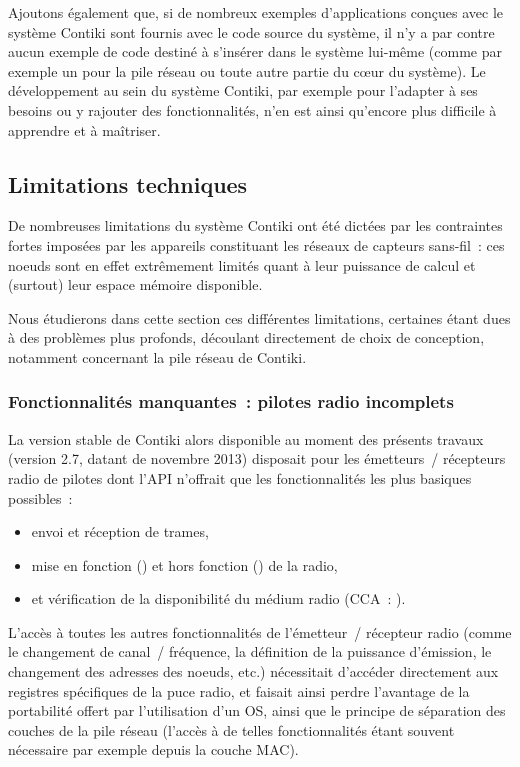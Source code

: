Ajoutons également que, si de nombreux exemples d'applications conçues
avec le système Contiki sont fournis avec le code source du système,
il n'y a par contre aucun exemple de code destiné à s'insérer dans
le système lui-même (comme par exemple un  pour la pile
réseau ou toute autre partie du c{\oe}ur du système). Le développement
au sein du système Contiki, par exemple pour l'adapter à ses besoins
ou y rajouter des fonctionnalités, n'en est ainsi qu'encore plus
difficile à apprendre et à maîtriser.


\subsection{Limitations techniques}
\label{SubsecLimContiki}

De nombreuses limitations du système Contiki ont été dictées par les
contraintes fortes imposées par les appareils constituant les réseaux de
capteurs sans-fil~: ces noeuds sont en effet extrêmement limités quant à
leur puissance de calcul et (surtout) leur espace mémoire disponible.

Nous étudierons dans cette section ces différentes limitations, certaines
étant dues à des problèmes plus profonds, découlant directement de
choix de conception, notamment concernant la pile réseau de Contiki.

\subsubsection{Fonctionnalités manquantes~: pilotes radio incomplets}
\label{ParAPIRadioContiki}

La version stable de Contiki alors disponible au moment des présents
travaux (version 2.7, datant de novembre 2013) disposait pour les
émetteurs~/ récepteurs radio de pilotes dont l'API n'offrait que les
fonctionnalités les plus basiques possibles~:
\begin{itemize}
\item envoi et réception de trames,
\item mise en fonction () et hors fonction ()
de la radio,
\item et vérification de la disponibilité du médium radio (CCA~: ).
\end{itemize}
L'accès à toutes les autres fonctionnalités de l'émetteur~/ récepteur radio
(comme le changement de canal~/ fréquence, la définition de la puissance
d'émission, le changement des adresses des noeuds, etc.) nécessitait
d'accéder directement aux registres spécifiques de la puce radio, et faisait
ainsi perdre l'avantage de la portabilité offert par l'utilisation d'un OS,
ainsi que le principe de séparation des couches de la pile réseau (l'accès
à de telles fonctionnalités étant souvent nécessaire par exemple depuis
la couche MAC).

